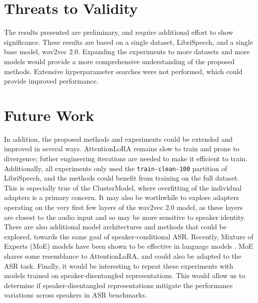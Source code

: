 \section{Threats to Validity}

The results presented are preliminary, and require additional effort to show significance.
These results are based on a single dataset, LibriSpeech, and a single base model, wav2vec 2.0.
Expanding the experiments to more datasets and more models would provide a more comprehensive understanding of the proposed methods.
Extensive hyperparameter searches were not performed, which could provide improved performance.


\section{Future Work}
In addition, the proposed methods and experiments could be extended and improved in several ways.
AttentionLoRA remains slow to train and prone to divergence; futher engineering iterations are needed to make it efficient to train.
Additionally, all experiments only used the \verb|train-clean-100| partition of LibriSpeech, and the methods could benefit from training on the full dataset.
This is especially true of the ClusterModel, where overfitting of the individual adapters is a primary concern.
It may also be worthwhile to explore adapters operating on the very first few layers of the wav2vec 2.0 model, as these layers are closest to the audio input and so may be more sensitive to speaker identity.
There are also additional model architectures and methods that could be explored, towards the same goal of speaker-conditional ASR.
Recently, Mixture of Experts (MoE) models have been shown to be effective in language models \cite{shazeer2017outrageously}.
MoE shares some resemblance to AttentionLoRA, and could also be adapted to the ASR task.
Finally, it would be interesting to repeat these experiments with models trained on speaker-disentangled representations. 
This would allow us to determine if speaker-disentangled representations mitigate the performance variations across speakers in ASR benchmarks.

